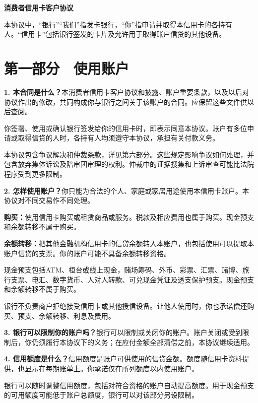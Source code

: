 \documentclass[UTF8,fontset=none,11pt,a4paper]{ctexart}
\begin{document}
{\noindent\fontsize{20}{25}\selectfont\bfseries 消费者信用卡客户协议\par}
\vspace{10pt}
本协议中，“银行”“我们”指发卡银行，“你”指申请并取得本信用卡的各持有人。“信用卡”包括银行签发的卡片及允许用于取得账户信贷的其他设备。


\section*{第一部分　使用账户}
\textbf{1. 本合同是什么？}本消费者信用卡客户协议和披露、账户重要条款，以及以后对协议作出的修改，共同构成你与银行之间关于该账户的合同。应保留这些文件供以后查阅。


你签署、使用或确认银行签发给你的信用卡时，即表示同意本协议。账户有多位申请或取得信贷的人时，各持有人均须遵守本协议，承担有关付款义务。


本协议包含争议解决和仲裁条款，详见第六部分。这些规定影响争议如何处理，并包含放弃集体诉讼及陪审团审理的权利。仲裁中的证据搜集和上诉审查可能比法院程序受到更多限制。


\textbf{2. 怎样使用账户？}你只能为合法的个人、家庭或家居用途使用本信用卡账户。本协议对不同交易作不同处理。


\textbf{购买：}使用信用卡购买或租赁商品或服务。税款及相应费用也属于购买。现金预支和余额转移不属于购买。


\textbf{余额转移：}把其他金融机构信用卡的信贷余额转入本账户，也包括使用可以提取本账户信贷的支票。你的账户可能不具备余额转移资格。


现金预支包括ATM、柜台或线上现金，赌场筹码、外币、彩票、汇票、赌博、旅行支票、电汇、数字货币、人对人转款、可兑现金凭证及透支保护预支。现金预支和余额转移不属于购买。


银行不负责商户拒绝接受信用卡或其他授信设备。让他人使用时，你也承诺偿还购买、预支、余额转移、利息及费用。


\textbf{3. 银行可以限制你的账户吗？}银行可以限制或关闭你的账户。账户关闭或受到限制后，你仍须履行本协议下的义务；在应付金额全部清偿之前，本协议继续适用。


\textbf{4. 信用额度是什么？}信用额度是账户可供使用的信贷金额。额度随信用卡资料提供，也显示在每期账单上。你承诺仅在所列额度以内使用账户。


银行可以随时调整信用额度，包括对符合资格的账户自动提高额度。用于现金预支的可用额度可能低于账户总额度，银行可以对该部分另设限制。
\end{document}
